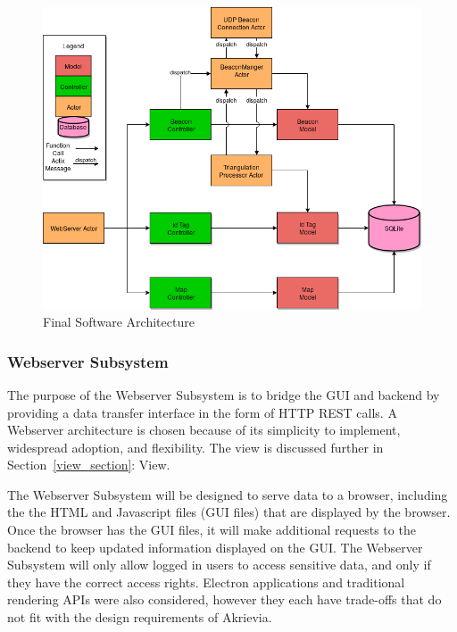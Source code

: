 \bigskip
\begin{figure}[H]
	\centering
    \includegraphics[scale=0.55]{images/prototype_software_arch.png}
    \caption{Final Software Architecture}
    \label{software_final_arch}
\end{figure}

\bigskip
\subsubsection{Webserver Subsystem}
\medskip
The purpose of the Webserver Subsystem is to bridge the GUI and backend by providing a data transfer interface in the form of HTTP REST calls.
A Webserver architecture is chosen because of its simplicity to implement, widespread adoption, and flexibility.
The view is discussed further in Section~\ref{view_section}: View.

\bigskip
The Webserver Subsystem will be designed to serve data to a browser, including the the HTML and Javascript files (GUI files) that are displayed by the browser.
Once the browser has the GUI files, it will make additional requests to the backend to keep updated information displayed on the GUI.
The Webserver Subsystem will only allow logged in users to access sensitive data, and only if they have the correct access rights.
Electron applications and traditional rendering APIs were also considered, however they each have trade-offs that do not fit with the design requirements of Akrievia.

